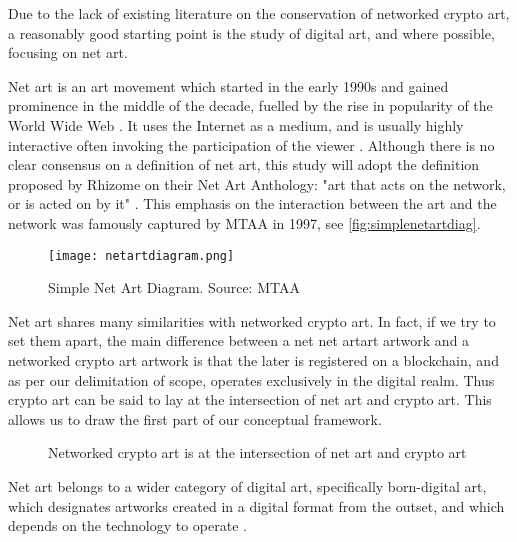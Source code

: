 Due to the lack of existing literature on the conservation of networked crypto art, a reasonably good starting point is the study of digital art, and where possible, focusing on net art.

Net art is an art movement which started in the early 1990s and gained prominence in the middle of the decade, fuelled by the rise in popularity of the World Wide Web \cite{schreiberNetArtShedding2001}. It uses the Internet as a medium, and is usually highly interactive often invoking the participation of the viewer \cite{kholeifInternet_ArtBirthWeb2023}. Although there is no clear consensus on a definition of net art, this study will adopt the definition proposed by Rhizome on their Net Art Anthology: "art that acts on the network, or is acted on by it" \cite{WhatNetArt2017}.
This emphasis on the interaction between the art and the network was famously captured by MTAA in 1997, see \autoref{fig:simplenetartdiag}.

\begin{figure}[h]
    \centering
    \captionsetup{justification=centering}
    \texttt{[image: netartdiagram.png]}
    \caption[Simple Net Art Diagram]{Simple Net Art Diagram. Source: MTAA \cite{NETARTANTHOLOGY2016a}}
    \label{fig:simplenetartdiag}
\end{figure}

Net art shares many similarities with networked crypto art. In fact, if we try to set them apart, the main difference between a net net artart artwork and a networked crypto art artwork is that the later is registered on a blockchain, and as per our delimitation of scope, operates exclusively in the digital realm. Thus crypto art can be said to lay at the intersection of net art and crypto art. This allows us to draw the first part of our conceptual framework.


\begin{figure}[h]
    \centering
    \captionsetup{justification=centering}
    
    \caption[Networked crypto art at the intersection of net art and crypto art]{Networked crypto art is at the intersection of net art and crypto art}
    \label{fig:netart-crypto-art}
\end{figure}

Net art belongs to a wider category of digital art, specifically born-digital art, which designates artworks created in a digital format from the outset, and which depends on the technology to operate \cite{innocentiKeepingBitsAlive2013}.

